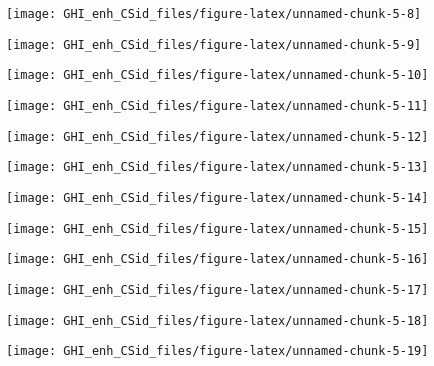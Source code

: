 \documentclass[
  10pt,
  a4paper,oneside]{article}
\begin{document}
\begin{center}\texttt{[image: GHI\_enh\_CSid\_files/figure-latex/unnamed-chunk-5-8]} \end{center}

\begin{center}\texttt{[image: GHI\_enh\_CSid\_files/figure-latex/unnamed-chunk-5-9]} \end{center}

\begin{center}\texttt{[image: GHI\_enh\_CSid\_files/figure-latex/unnamed-chunk-5-10]} \end{center}

\begin{center}\texttt{[image: GHI\_enh\_CSid\_files/figure-latex/unnamed-chunk-5-11]} \end{center}

\begin{center}\texttt{[image: GHI\_enh\_CSid\_files/figure-latex/unnamed-chunk-5-12]} \end{center}

\begin{center}\texttt{[image: GHI\_enh\_CSid\_files/figure-latex/unnamed-chunk-5-13]} \end{center}

\begin{center}\texttt{[image: GHI\_enh\_CSid\_files/figure-latex/unnamed-chunk-5-14]} \end{center}

\begin{center}\texttt{[image: GHI\_enh\_CSid\_files/figure-latex/unnamed-chunk-5-15]} \end{center}

\begin{center}\texttt{[image: GHI\_enh\_CSid\_files/figure-latex/unnamed-chunk-5-16]} \end{center}

\begin{center}\texttt{[image: GHI\_enh\_CSid\_files/figure-latex/unnamed-chunk-5-17]} \end{center}

\begin{center}\texttt{[image: GHI\_enh\_CSid\_files/figure-latex/unnamed-chunk-5-18]} \end{center}

\begin{center}\texttt{[image: GHI\_enh\_CSid\_files/figure-latex/unnamed-chunk-5-19]} \end{center}
\end{document}
